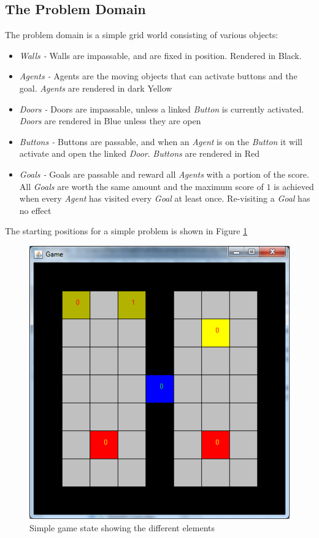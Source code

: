 \documentclass{IEEEtran}
\begin{document}
\subsection{The Problem Domain}
The problem domain is a simple grid world consisting of various objects:
\begin{itemize}
\item{\emph{Walls - } Walls are impassable, and are fixed in position. Rendered in Black.}
\item{\emph{Agents - } Agents are the moving objects that can activate buttons and the goal. \emph{Agents} are rendered in dark Yellow}
\item{\emph{Doors - } Doors are impassable, unless a linked \emph{Button} is currently activated. \emph{Doors} are rendered in Blue unless they are open}
\item{\emph{Buttons - } Buttons are passable, and when an \emph{Agent} is on the \emph{Button} it will activate and open the linked \emph{Door}. \emph{Buttons} are rendered in Red}
\item{\emph{Goals - } Goals are passable and reward all \emph{Agents} with a portion of the score. All \emph{Goals} are worth the same amount and the maximum score of $1$ is achieved when every \emph{Agent} has visited every \emph{Goal} at least once. Re-visiting a \emph{Goal} has no effect}
\end{itemize}

The starting positions for a simple problem is shown in Figure \ref{InitialState}
\begin{figure}[ht]
\includegraphics[scale=0.5]{InitialState}
\caption{Simple game state showing the different elements}
\label{InitialState}
\end{figure}
\end{document}
